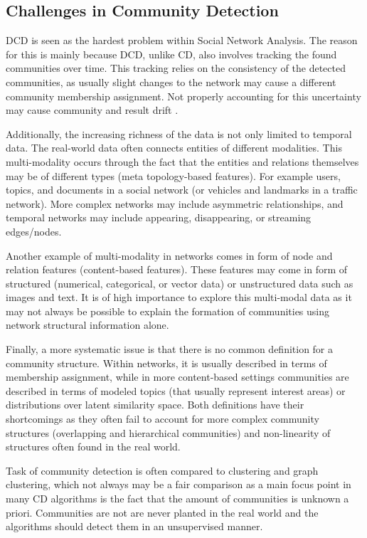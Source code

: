 \documentclass[
acmsmall,
nonacm,
screen,
acmthm]{../../scripts/pandoc/templates/acmart}
\begin{document}
\hypertarget{challenges-in-community-detection}{%
\subsection{Challenges in Community
Detection}\label{challenges-in-community-detection}}

DCD is seen as the hardest problem within Social Network Analysis. The
reason for this is mainly because DCD, unlike CD, also involves tracking
the found communities over time. This tracking relies on the consistency
of the detected communities, as usually slight changes to the network
may cause a different community membership assignment. Not properly
accounting for this uncertainty may cause community and result drift
\citep{dakicheTrackingCommunityEvolution2019}.

Additionally, the increasing richness of the data is not only limited to
temporal data. The real-world data often connects entities of different
modalities. This multi-modality occurs through the fact that the
entities and relations themselves may be of different types (meta
topology-based features). For example users, topics, and documents in a
social network (or vehicles and landmarks in a traffic network). More
complex networks may include asymmetric relationships, and temporal
networks may include appearing, disappearing, or streaming edges/nodes.

Another example of multi-modality in networks comes in form of node and
relation features (content-based features). These features may come in
form of structured (numerical, categorical, or vector data) or
unstructured data such as images and text. It is of high importance to
explore this multi-modal data as it may not always be possible to
explain the formation of communities using network structural
information alone.

Finally, a more systematic issue is that there is no common definition
for a community structure. Within networks, it is usually described in
terms of membership assignment, while in more content-based settings
communities are described in terms of modeled topics (that usually
represent interest areas) or distributions over latent similarity space.
Both definitions have their shortcomings as they often fail to account
for more complex community structures (overlapping and hierarchical
communities) and non-linearity of structures often found in the real
world.

Task of community detection is often compared to clustering and graph
clustering, which not always may be a fair comparison as a main focus
point in many CD algorithms is the fact that the amount of communities
is unknown a priori. Communities are not are never planted in the real
world and the algorithms should detect them in an unsupervised manner.
\end{document}
